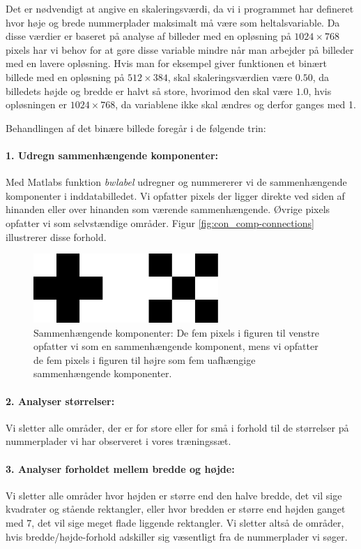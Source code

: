 Det er nødvendigt at angive en skaleringsværdi, da vi i programmet har defineret hvor høje og brede nummerplader maksimalt må være som heltalsvariable. Da disse værdier er baseret på analyse af billeder med en opløsning på $1024 \times 768$ pixels har vi behov for at gøre disse variable mindre når man arbejder på billeder med en lavere opløsning. Hvis man for eksempel giver funktionen et binært billede med en opløsning på $512 \times 384$, skal skaleringsværdien være $0.50$, da billedets højde og bredde er halvt så store, hvorimod den skal være $1.0$, hvis opløsningen er $1024 \times 768$, da variablene ikke skal ændres og derfor ganges med 1.

Behandlingen af det binære billede foregår i de følgende trin:

\paragraph{1. Udregn sammenhængende komponenter:}
Med Matlabs funktion \textit{bwlabel} udregner og nummererer vi de sammenhængende komponenter i inddatabilledet. Vi opfatter pixels der ligger direkte ved siden af hinanden eller over hinanden som værende sammenhængende. Øvrige pixels opfatter vi som selvstændige områder. Figur \vref{fig:con_comp-connections} illustrerer disse forhold.

\begin{figure}[htp]
\centering
\includegraphics[width=7cm]{implementation/illu/con_comp-connections.pdf}
\caption{Sammenhængende komponenter: De fem pixels i figuren til venstre opfatter vi som en sammenhængende komponent, mens vi opfatter de fem pixels i figuren til højre som fem uafhængige sammenhængende komponenter.}
\label{fig:con_comp-connections}
\end{figure}

\paragraph{2. Analyser størrelser:}
Vi sletter alle områder, der er for store eller for små i forhold til de størrelser på nummerplader vi har observeret i vores træningssæt.

\paragraph{3. Analyser forholdet mellem bredde og højde:}
Vi sletter alle områder hvor højden er større end den halve bredde, det vil sige kvadrater og stående rektangler, eller hvor bredden er større end højden ganget med 7, det vil sige meget flade liggende rektangler. Vi sletter altså de områder, hvis bredde/højde-forhold adskiller sig væsentligt fra de nummerplader vi søger.

